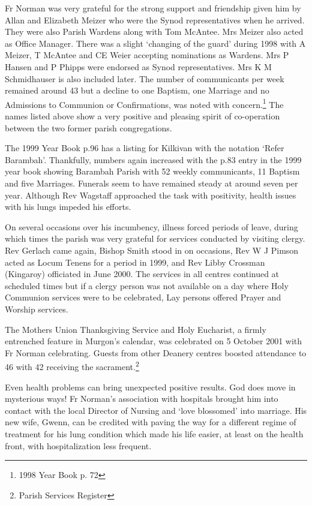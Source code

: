 Fr Norman was very grateful for the strong support and friendship given him by Allan and Elizabeth Meizer who were the Synod representatives when he arrived. They were also Parish Wardens along with Tom McAntee. Mrs Meizer also acted as Office Manager. There was a slight `changing of the guard' during 1998 with A Meizer, T McAntee and CE Weier accepting nominations as Wardens. Mrs P Hansen and P Phipps were endorsed as Synod representatives. Mrs K M Schmidhauser is also included later. The number of communicants per week remained around 43 but a decline to one Baptism, one Marriage and no Admissions to Communion or Confirmations, was noted with concern.\footnote{1998 Year Book p. 72} The names listed above show a very positive and pleasing spirit of co-operation between the two former parish congregations.


The 1999 Year Book p.96 has a listing for Kilkivan with the notation `Refer Barambah'. Thankfully, numbers again increased with the p.83 entry in the 1999 year book showing Barambah Parish with 52 weekly communicants, 11 Baptism and five Marriages. Funerals seem to have remained steady at around seven per year. Although Rev Wagstaff approached the task with positivity, health issues with his lungs impeded his efforts.



On several occasions over his incumbency, illness forced periods of leave, during which times the parish was very grateful for services conducted by visiting clergy. Rev Gerlach came again, Bishop Smith stood in on occasions, Rev W J Pimson acted as Locum Tenens for a period in 1999, and Rev Libby Crossman (Kingaroy) officiated in June 2000. The services in all centres continued at scheduled times but if a clergy person was not available on a day where Holy Communion services were to be celebrated, Lay persons offered Prayer and Worship services.



The Mothers Union Thanksgiving Service and Holy Eucharist, a firmly entrenched feature in Murgon's calendar, was celebrated on 5 October 2001 with Fr Norman celebrating. Guests from other Deanery centres boosted attendance to 46 with 42 receiving the sacrament.\footnote{Parish Services Register}


Even health problems can bring unexpected positive results. God does move in mysterious ways! Fr Norman's association with hospitals brought him into contact with the local Director of Nursing and `love blossomed' into marriage. His new wife, Gwenn, can be credited with paving the way for a different regime of treatment for his lung condition which made his life easier, at least on the health front, with hospitalization less frequent.



